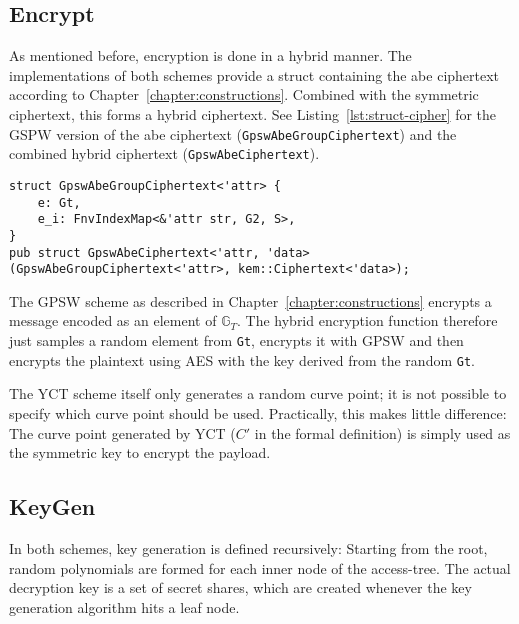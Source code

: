 \subsection{Encrypt}
As mentioned before, encryption is done in a hybrid manner.
The implementations of both schemes provide a struct containing the \acrshort{abe} ciphertext according to Chapter~\ref{chapter:constructions}.
Combined with the symmetric ciphertext, this forms a hybrid ciphertext.
See Listing~\ref{lst:struct-cipher} for the GSPW version of the \acrshort{abe} ciphertext (\verb+GpswAbeGroupCiphertext+) and the combined hybrid ciphertext (\verb+GpswAbeCiphertext+).

\begin{lstlisting}[caption={ABE ciphertext structure for GPSW},label={lst:struct-cipher}, breaklines=true]
struct GpswAbeGroupCiphertext<'attr> {
    e: Gt, 
    e_i: FnvIndexMap<&'attr str, G2, S>,
}
pub struct GpswAbeCiphertext<'attr, 'data>(GpswAbeGroupCiphertext<'attr>, kem::Ciphertext<'data>);
\end{lstlisting}
The GPSW scheme as described in Chapter~\ref{chapter:constructions} encrypts a message encoded as an element of $\mathbb{G}_T$.
The hybrid encryption function therefore just samples a random element from \texttt{Gt}, encrypts it with GPSW and then encrypts the plaintext using AES with the key derived from the random \texttt{Gt}.

The YCT scheme itself only generates a random curve point; it is not possible to specify which curve point should be used.
Practically, this makes little difference:
The curve point generated by YCT ($C'$ in the formal definition) is simply used as the symmetric key to encrypt the payload.
  

\subsection{KeyGen}
In both schemes, key generation is defined recursively:
Starting from the root, random polynomials are formed for each inner node of the \gls{access-tree}.
The actual decryption key is a set of secret shares, which are created whenever the key generation algorithm hits a leaf node.

